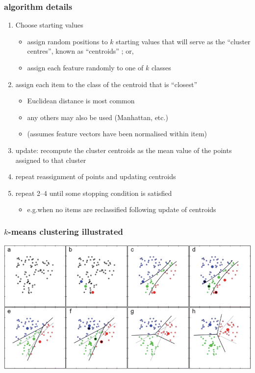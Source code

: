\documentclass{beamer}
\begin{document}
\begin{frame}
	\frametitle{algorithm details}
	\begin{enumerate}
		\item \pause Choose starting values
		\begin{itemize}
			\item \pause assign random positions to $k$ starting values that will
			serve as the ``cluster centres'', known as ``centroids'' ; or,
			\item assign each feature randomly to one of $k$ classes
		\end{itemize}
		\item \pause assign each item to the class of the centroid that is ``closest''
		\begin{itemize}
			\item Euclidean distance is most common
			\item any others may also be used (Manhattan, etc.)
			\item (assumes feature vectors have been normalised within item)
		\end{itemize}
		\item  \pause update: recompute the cluster centroids as the mean value of
		the points assigned to that cluster
		\item  \pause repeat reassignment of points and updating centroids
		\item  \pause repeat 2--4 until some stopping condition is satisfied
		\begin{itemize}
			\item e.g.\@ when no items are reclassified following update of centroids
		\end{itemize}
		
	\end{enumerate}
\end{frame}

\begin{frame}
	\frametitle{$k$-means clustering illustrated}
	\includegraphics[width=\textwidth]{figures/kmeans.png}
\end{frame}
\end{document}
